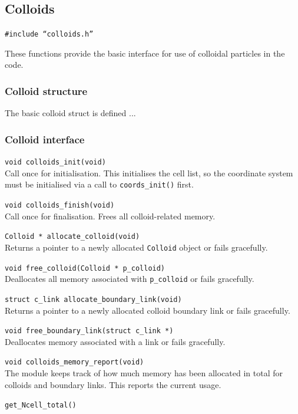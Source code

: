 \subsection{Colloids}

\texttt{\#include ``colloids.h''}

These functions provide the basic interface for use
of colloidal particles in the code.

\subsubsection{Colloid structure}

The basic colloid struct is defined ...
 

\subsubsection{Colloid interface}

\texttt{void colloids\_init(void)}\\
Call once for initialisation. This initialises the cell list,
so the coordinate system must be initialised via a call to
\texttt{coords\_init()} first.

\texttt{void colloids\_finish(void)}\\
Call once for finalisation. Frees all colloid-related memory.

\texttt{Colloid * allocate\_colloid(void)}\\
Returns a pointer to a newly allocated \texttt{Colloid} object
or fails gracefully.

\texttt{void free\_colloid(Colloid * p\_colloid)}\\
Deallocates all memory associated with \texttt{p\_colloid} or
fails gracefully.

\texttt{struct c\_link allocate\_boundary\_link(void)}\\
Returns a pointer to a newly allocated colloid boundary
link or fails gracefully.

\texttt{void free\_boundary\_link(struct c\_link *)}\\
Deallocates memory associated with a link or fails gracefully.

\texttt{void colloids\_memory\_report(void)}\\
The module keeps track of how much memory has been allocated in
total for colloids and boundary links. This reports the current
usage.

\texttt{get\_Ncell\_total()}\\

